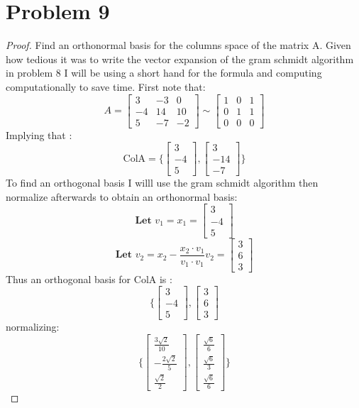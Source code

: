 \documentclass[12pt]{article}
\newcommand{\sect}[1]{\section*{#1}}
\begin{document}
\sect{Problem 9}
\begin{proof}
Find an orthonormal basis for the columns space of the matrix A. Given how tedious it was to write the vector expansion of the gram schmidt algorithm in problem 8 I will be using a short hand for the formula and computing computationally to save time. First note that:
\[
  A=\begin{bmatrix}
    3&-3&0\\-4&14&10\\5&-7&-2
\end{bmatrix}\sim\begin{bmatrix}
  1&0&1\\0&1&1\\0&0&0
\end{bmatrix}
\]
Implying that :
\[
  \text{ColA}=\{\begin{bmatrix}
    3\\-4\\5
  \end{bmatrix},\begin{bmatrix}
    3\\-14\\-7
\end{bmatrix}\}
\]
To find an orthogonal basis I willl use the gram schmidt algorithm then normalize afterwards to obtain an orthonormal basis:
\[
  \textbf{Let }v_1=x_1=\begin{bmatrix}
    3\\-4\\5
  \end{bmatrix}
\]
\[
  \textbf{Let }v_2=x_2-\frac{x_2\cdot v_1 }{v_1 \cdot v_1}v_2=\begin{bmatrix}
    3\\6\\3
  \end{bmatrix}
\]
Thus an orthogonal basis for ColA is :
\[
  \{\begin{bmatrix}
    3\\-4\\5
  \end{bmatrix},\begin{bmatrix}
    3\\6\\3
  \end{bmatrix}
\]
normalizing:
\[
\renewcommand\arraystretch{2}
\{\begin{bmatrix}
  \frac{3\sqrt{2}}{10}\\-\frac{2\sqrt{2}}{5}\\\frac{\sqrt{2}}{2}
\end{bmatrix},\begin{bmatrix}
  \frac{\sqrt{6}}{6}\\\frac{\sqrt{6}}{3}\\\frac{\sqrt{6}}{6}
\end{bmatrix}\}
\]
\end{proof}
\end{document}
